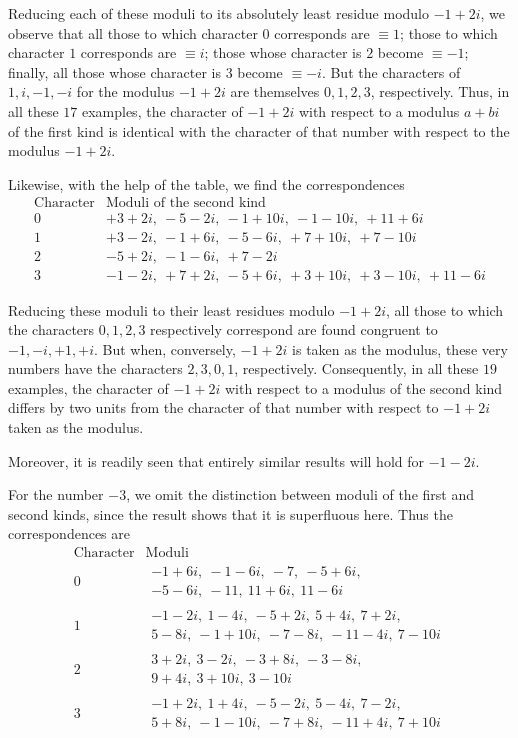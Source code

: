 Reducing each of these moduli to its absolutely least residue modulo $-1+2i$, we observe that all those to which character $0$ corresponds are $\equiv1$; those to which character $1$ corresponds are $\equiv i$; those whose character is $2$ become $\equiv-1$; finally, all those whose character is $3$ become $\equiv-i$. But the characters of $1,i,-1,-i$ for the modulus $-1+2i$ are themselves $0,1,2,3$, respectively. Thus, in all these $17$ examples, the character of $-1+2i$ with respect to a modulus $a+bi$ of the first kind is identical with the character of that number with respect to the modulus $-1+2i$.

Likewise, with the help of the table, we find the correspondences
\[
\begin{array}{c|l}
\text{Character}&\text{Moduli of the second kind}\\\hline
0&+3+2i,\ -5-2i,\ -1+10i,\ -1-10i,\ +11+6i\\
1&+3-2i,\ -1+6i,\ -5-6i,\ +7+10i,\ +7-10i\\
2&-5+2i,\ -1-6i,\ +7-2i\\
3&-1-2i,\ +7+2i,\ -5+6i,\ +3+10i,\ +3-10i,\ +11-6i
\end{array}
\]

Reducing these moduli to their least residues modulo $-1+2i$, all those to which the characters $0,1,2,3$ respectively correspond are found congruent to $-1,-i,+1,+i$. But when, conversely, $-1+2i$ is taken as the modulus, these very numbers have the characters $2,3,0,1$, respectively. Consequently, in all these $19$ examples, the character of $-1+2i$ with respect to a modulus of the second kind differs by two units from the character of that number with respect to $-1+2i$ taken as the modulus.

Moreover, it is readily seen that entirely similar results will hold for $-1-2i$.

For the number $-3$, we omit the distinction between moduli of the first and second kinds, since the result shows that it is superfluous here. Thus the correspondences are
%
\[
\begin{array}{c|l}
\text{Character}&\text{Moduli}\\\hline
0&\begin{gathered}-1+6i,\ -1-6i,\ -7,\ -5+6i,\\-5-6i,\ -11,\ 11+6i,\ 11-6i\end{gathered}\\[3pt]
1&\begin{gathered}-1-2i,\ 1-4i,\ -5+2i,\ 5+4i,\ 7+2i,\\5-8i,\ -1+10i,\ -7-8i,\ -11-4i,\ 7-10i\end{gathered}\\[3pt]
2&\begin{gathered}3+2i,\ 3-2i,\ -3+8i,\ -3-8i,\\9+4i,\ 3+10i,\ 3-10i\end{gathered}\\[3pt]
3&\begin{gathered}-1+2i,\ 1+4i,\ -5-2i,\ 5-4i,\ 7-2i,\\5+8i,\ -1-10i,\ -7+8i,\ -11+4i,\ 7+10i\end{gathered}
\end{array}
\]

